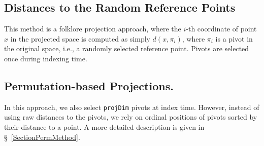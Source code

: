 \documentclass[runningheads,a4paper]{llncs}
\newcommand{\ttt}[1]{\texttt{#1}}
\begin{document}
\begin{appendix}
\subsection{Distances to the Random Reference Points} 
This method is a folklore projection approach,
where the \mbox{$i$-th} coordinate of point $x$ in the projected space is computed as simply $d(x, \pi_i)$,
where $\pi_i$ is a pivot in the original space, i.e., a randomly selected reference point.
Pivots are selected once during indexing time.

\subsection{Permutation-based Projections.}
In this approach, we also select \ttt{projDim} pivots at index time.
However, instead of using raw distances to the pivots,
we rely on ordinal positions of pivots sorted by their distance to a point.  
A more detailed description is given in \S~\ref{SectionPermMethod}.
\end{appendix}
\end{document}
